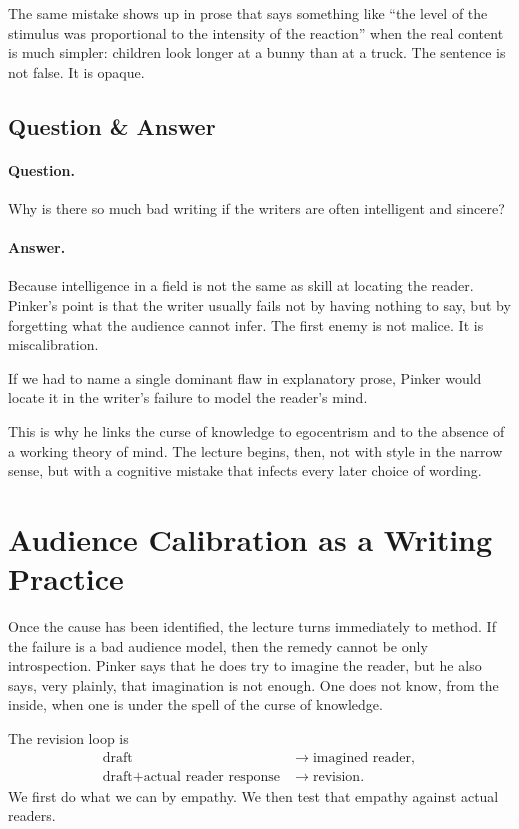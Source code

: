 The same mistake shows up in prose that says something like ``the level of the stimulus was proportional to the intensity of the reaction'' when the real content is much simpler: children look longer at a bunny than at a truck. The sentence is not false. It is opaque.

\subsection{Question \& Answer}

\paragraph{Question.} Why is there so much bad writing if the writers are often intelligent and sincere?

\paragraph{Answer.} Because intelligence in a field is not the same as skill at locating the reader. Pinker's point is that the writer usually fails not by having nothing to say, but by forgetting what the audience cannot infer. The first enemy is not malice. It is miscalibration.

\begin{proposition}
If we had to name a single dominant flaw in explanatory prose, Pinker would locate it in the writer's failure to model the reader's mind.
\end{proposition}

This is why he links the curse of knowledge to egocentrism and to the absence of a working theory of mind. The lecture begins, then, not with style in the narrow sense, but with a cognitive mistake that infects every later choice of wording.

\section{Audience Calibration as a Writing Practice}

Once the cause has been identified, the lecture turns immediately to method. If the failure is a bad audience model, then the remedy cannot be only introspection. Pinker says that he does try to imagine the reader, but he also says, very plainly, that imagination is not enough. One does not know, from the inside, when one is under the spell of the curse of knowledge.

The revision loop is
\begin{align}
\text{draft} &\to \text{imagined reader}, \\
\text{draft} + \text{actual reader response} &\to \text{revision}.
\end{align}
We first do what we can by empathy. We then test that empathy against actual readers.

